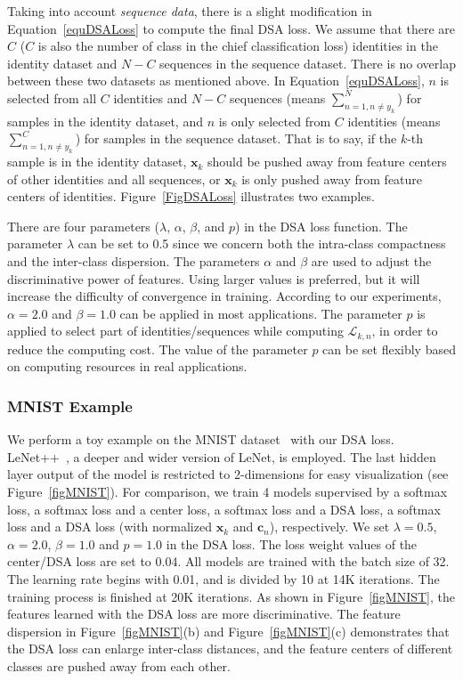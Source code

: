 \documentclass[conference]{acmsiggraph}
\renewcommand{\vec}[1]{\mathbf{#1}}
\begin{document}
Taking into account \emph{sequence data}, there is a slight modification in Equation~\ref{equDSALoss} to compute the final DSA loss. We assume that there are $C$ ($C$ is also the number of class in the chief classification loss) identities in the identity dataset and $N-C$ sequences in the sequence dataset. There is no overlap between these two datasets as mentioned above. In Equation~\ref{equDSALoss}, $n$ is selected from all $C$ identities and $N-C$ sequences (means $\sum\nolimits_{n=1,n\neq y_k}^{N}$) for samples in the identity dataset, and $n$ is only selected from $C$ identities (means $\sum\nolimits_{n=1,n\neq y_k}^{C}$) for samples in the sequence dataset. That is to say, if the $k$-th sample is in the identity dataset, $\vec{x}_k$ should be pushed away from feature centers of other identities and all sequences, or $\vec{x}_k$ is only pushed away from feature centers of identities. Figure~\ref{FigDSALoss} illustrates two examples. 


There are four parameters ($\lambda$, $\alpha$, $\beta$, and $p$) in the DSA loss function. The parameter $\lambda$ can be set to 0.5 since we concern both the intra-class compactness and the inter-class dispersion. The parameters $\alpha$ and $\beta$ are used to adjust the discriminative power of features. Using larger values is preferred, but it will increase the difficulty of convergence in training. According to our experiments, $\alpha=2.0$ and $\beta=1.0$ can be applied in most applications. The parameter $p$ is applied to select part of identities/sequences while computing $\mathcal{L}_{k,n}$, in order to reduce the computing cost. The value of the parameter $p$ can be set flexibly based on computing resources in real applications. 

\subsubsection{MNIST Example} We perform a toy example on the MNIST dataset~\cite{mnist} with our DSA loss. LeNet++~\cite{centerloss}, a deeper and wider version of LeNet, is employed. The last hidden layer output of the model is restricted to 2-dimensions for easy visualization (see Figure~\ref{figMNIST}). For comparison, we train 4 models supervised by a softmax loss, a softmax loss and a center loss, a softmax loss and a DSA loss, a softmax loss and a DSA loss (with normalized $\vec{x}_k$ and $\vec{c}_n$), respectively. We set $\lambda=0.5$, $\alpha=2.0$, $\beta=1.0$ and $p = 1.0$ in the DSA loss. The loss weight values of the center/DSA loss are set to 0.04. All models are trained with the batch size of 32. The learning rate begins with 0.01, and is divided by 10 at 14K iterations. The training process is finished at 20K iterations. As shown in Figure~\ref{figMNIST}, the features learned with the DSA loss are more discriminative. The feature dispersion in Figure~\ref{figMNIST}(b) and Figure~\ref{figMNIST}(c) demonstrates that the DSA loss can enlarge inter-class distances, and the feature centers of different classes are pushed away from each other.
\end{document}
